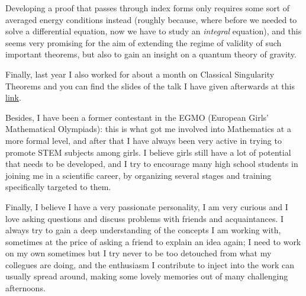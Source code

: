 \documentclass[12pt, a4paper]{article}
\begin{document}
Developing a proof that passes through index forms only requires some sort of averaged energy conditions instead (roughly because, where before we needed to solve a differential equation, now we have to study an \emph{integral} equation), and this seems very promising for the aim of extending the regime of validity of such important theorems, but also to gain an insight on a quantum theory of gravity.

Finally, last year I also worked for about a month on Classical Singularity Theorems and you can find the slides of the talk I have given afterwards at this \href{https://uz.sns.it/~ver22albireo/ext-file/colloquio/slides.pdf}{link}.

Besides, I have been a former contestant in the EGMO (European Girls' Mathematical Olympiads): this is what got me involved into Mathematics at a more formal level, and after that I have always been very active in trying to promote STEM subjects among girls. I believe girls still have a lot of potential that needs to be developed, and I try to encourage many high school students in joining me in a scientific career, by organizing several stages and training specifically targeted to them.

Finally, I believe I have a very passionate personality, I am very curious and I love asking questions and discuss problems with friends and acquaintances. I always try to gain a deep understanding of the concepts I am working with, sometimes at the price of asking a friend to explain an idea again; I need to work on my own sometimes but I try never to be too detouched from what my collegues are doing, and the enthusiasm I contribute to inject into the work can usually spread around, making some lovely memories out of many challenging afternoons.
\end{document}
